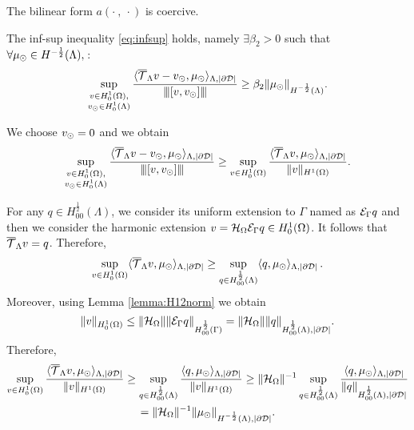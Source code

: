 \begin{lemma}\label{lemma:prob2_coercivity}
The bilinear form $a(\cdot \ , \ \cdot)$ is coercive.
\end{lemma}

\begin{lemma}
The inf-sup inequality \eqref{eq:infsup} holds, namely $ \exists \beta_2 >0$ such that $\forall \mu_{\odot} \in H^{-\frac 12}(\Lambda),\,$:
\begin{equation*}
\sup _{\substack{v\in H^1_0(\Omega),\\ v_{\odot} \in H^1_0(\Lambda)}} \frac{ \langle {\overline{\mathcal{T}}_\Lambda} v - v_{\odot}, \mu_{\odot} \rangle_{\Lambda,|\partial\mathcal{D}|}}{{\left\vert\kern-0.25ex\left\vert\kern-0.25ex\left\vert [v,v_{\odot}] \right\vert\kern-0.25ex\right\vert\kern-0.25ex\right\vert}}
\geq \beta_2 \|\mu_{\odot}\|_{H^{-\frac 12}(\Lambda)}.
\end{equation*}
\end{lemma} 
We choose $v_{\odot}=0$ and we obtain
\begin{equation*}
\sup _{\substack{v\in H^1_0(\Omega),\\ v_{\odot} \in H^1_0(\Lambda)}} \frac{ \langle {\overline{\mathcal{T}}_\Lambda} v - v_{\odot}, \mu_{\odot} \rangle_{\Lambda,|\partial\mathcal{D}|}}{{\left\vert\kern-0.25ex\left\vert\kern-0.25ex\left\vert [v,v_{\odot}] \right\vert\kern-0.25ex\right\vert\kern-0.25ex\right\vert}}
\geq \sup _{v\in H^1_0(\Omega)} \frac{ \langle {\overline{\mathcal{T}}_\Lambda} v, \mu_{\odot} \rangle_{\Lambda,|\partial\mathcal{D}|}}{\|v\|_{H^1(\Omega)}}. 
\end{equation*}

For any $q \in H^{\frac 12}_{00}(\Lambda)$, we consider its uniform extension to $\Gamma$ named as $\mathcal{E}_\Gamma q$
and then we consider the harmonic extension $v=\mathcal{H}_\Omega \mathcal{E}_\Gamma q\in H^1_0(\Omega)$. It follows that ${\overline{\mathcal{T}}_\Lambda} v=q$. Therefore, 
\begin{equation*}
\sup _{v\in H^1_0(\Omega)}  \langle {\overline{\mathcal{T}}_\Lambda} v, \mu_{\odot} \rangle_{\Lambda,|\partial\mathcal{D}|} \geq\sup_{q \in H^{\frac 12}_{00}(\Lambda)} \langle q, \mu_{\odot}  \rangle_{\Lambda,|\partial\mathcal{D}|}\,.
\end{equation*}
Moreover, using Lemma \ref{lemma:H12norm} we obtain
\begin{equation*}
\|v\|_{H^1_0(\Omega)}\leq \|\mathcal{H}_\Omega\| \|\mathcal{E}_\Gamma q\|_{H^{\frac 12}_{00}(\Gamma)}  = \|\mathcal{H}_\Omega\| \|q\|_{H^{\frac 12}_{00}(\Lambda),|\partial\mathcal{D}|}.
\end{equation*}
 Therefore,
\begin{multline*}
\sup _{v\in H^1_0(\Omega)} \frac{ \langle {\overline{\mathcal{T}}_\Lambda} v, \mu_{\odot} \rangle_{\Lambda,|\partial\mathcal{D}|}}{\|v\|_{H^1(\Omega)}}
\geq \sup _{q\in H^{\frac 12}_{00}(\Lambda)} \frac{ \langle q, \mu_{\odot} \rangle_{\Lambda,|\partial\mathcal{D}|}}{\|v\|_{H^1(\Omega)}}
\geq \|\mathcal{H}_\Omega\|^{-1} \sup _{q\in H^{\frac 12}_{00}(\Lambda)} \frac{ \langle q, \mu_{\odot} \rangle_{\Lambda,|\partial\mathcal{D}|}}{\|q\|_{H^{\frac 12}_{00}(\Lambda),|\partial\mathcal{D}|}} 
\\= \|\mathcal{H}_\Omega\|^{-1} \|\mu_{\odot}\|_{H^{-\frac 12}(\Lambda),|\partial\mathcal{D}|}.
\end{multline*}




